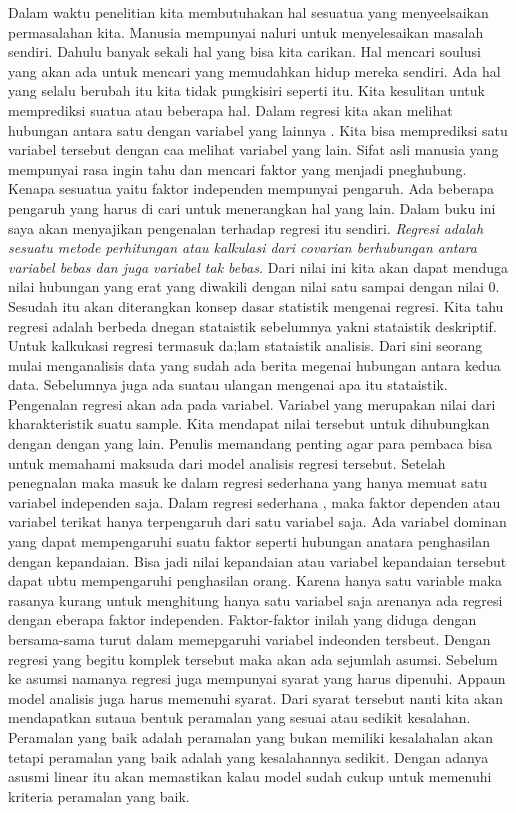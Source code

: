 \documentclass[
]{book}
\theoremstyle{definition}
\theoremstyle{definition}
\theoremstyle{definition}
\theoremstyle{definition}
\theoremstyle{remark}
\begin{document}
Dalam waktu penelitian kita membutuhakan hal sesuatua yang menyeelsaikan permasalahan kita. Manusia mempunyai naluri untuk menyelesaikan masalah sendiri. Dahulu banyak sekali hal yang bisa kita carikan. Hal mencari soulusi yang akan ada untuk mencari yang memudahkan hidup mereka sendiri.
Ada hal yang selalu berubah itu kita tidak pungkisiri seperti itu. Kita kesulitan untuk memprediksi suatua atau beberapa hal. Dalam regresi kita akan melihat hubungan antara satu dengan variabel yang lainnya . Kita bisa memprediksi satu variabel tersebut dengan caa melihat variabel yang lain.
Sifat asli manusia yang mempunyai rasa ingin tahu dan mencari faktor yang menjadi pneghubung. Kenapa sesuatua yaitu faktor independen mempunyai pengaruh. Ada beberapa pengaruh yang harus di cari untuk menerangkan hal yang lain.
Dalam buku ini saya akan menyajikan pengenalan terhadap regresi itu sendiri. \emph{Regresi adalah sesuatu metode perhitungan atau kalkulasi dari covarian berhubungan antara variabel bebas dan juga variabel tak bebas.} Dari nilai ini kita akan dapat menduga nilai hubungan yang erat yang diwakili dengan nilai satu sampai dengan nilai 0. Sesudah itu akan diterangkan konsep dasar statistik mengenai regresi. Kita tahu regresi adalah berbeda dnegan stataistik sebelumnya yakni stataistik deskriptif. Untuk kalkukasi regresi termasuk da;lam stataistik analisis. Dari sini seorang mulai menganalisis data yang sudah ada berita megenai hubungan antara kedua data.
Sebelumnya juga ada suatau ulangan mengenai apa itu stataistik. Pengenalan regresi akan ada pada variabel. Variabel yang merupakan nilai dari kharakteristik suatu sample. Kita mendapat nilai tersebut untuk dihubungkan dengan dengan yang lain. Penulis memandang penting agar para pembaca bisa untuk memahami maksuda dari model analisis regresi tersebut.
Setelah penegnalan maka masuk ke dalam regresi sederhana yang hanya memuat satu variabel independen saja. Dalam regresi sederhana , maka faktor dependen atau variabel terikat hanya terpengaruh dari satu variabel saja. Ada variabel dominan yang dapat mempengaruhi suatu faktor seperti hubungan anatara penghasilan dengan kepandaian. Bisa jadi nilai kepandaian atau variabel kepandaian tersebut dapat ubtu mempengaruhi penghasilan orang.
Karena hanya satu variable maka rasanya kurang untuk menghitung hanya satu variabel saja arenanya ada regresi dengan eberapa faktor independen. Faktor-faktor inilah yang diduga dengan bersama-sama turut dalam memepgaruhi variabel indeonden tersbeut. Dengan regresi yang begitu komplek tersebut maka akan ada sejumlah asumsi.
Sebelum ke asumsi namanya regresi juga mempunyai syarat yang harus dipenuhi. Appaun model analisis juga harus memenuhi syarat. Dari syarat tersebut nanti kita akan mendapatkan sutaua bentuk peramalan yang sesuai atau sedikit kesalahan. Peramalan yang baik adalah peramalan yang bukan memiliki kesalahalan akan tetapi peramalan yang baik adalah yang kesalahannya sedikit. Dengan adanya asusmi linear itu akan memastikan kalau model sudah cukup untuk memenuhi kriteria peramalan yang baik.
\end{document}
